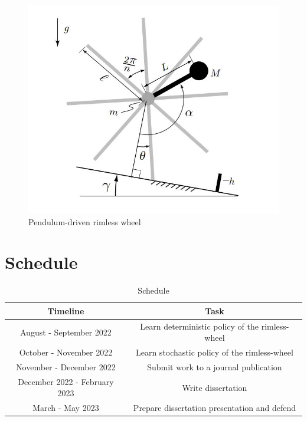 \begin{figure}[H]
    \centering
    \includegraphics[width=0.4\linewidth]{./figures/rimless_wheel.jpg}
    \caption{Pendulum-driven rimless wheel~\cite{bhounsule2016dead}}
    \label{fig:rimless}
\end{figure}
\section{Schedule}

\begin{table}[H]
    \centering
    \caption{Schedule}
    \begin{tabular}{|c|c|}
    \toprule
    \textbf{Timeline} & \textbf{Task} \\
    \midrule 
    \midrule
        August - September 2022 & Learn deterministic policy of the rimless-wheel \\ 
        October - November 2022 & Learn stochastic policy of the rimless-wheel \\
        November - December 2022 & Submit work to a journal publication \\
        December 2022 - February 2023 & Write dissertation \\
        March - May 2023 & Prepare dissertation presentation and defend \\
    \bottomrule
    \end{tabular}
    \label{tab:training_setup_neuralpbc}
\end{table}

